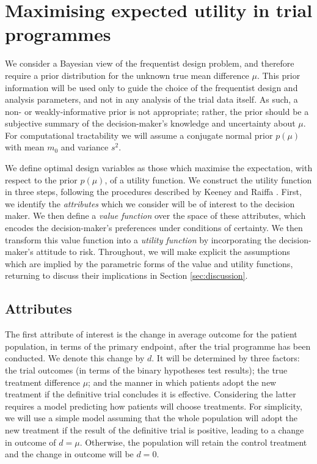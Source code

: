 \documentclass[sagev, Crown]{sagej} %
\begin{document}

\section{Maximising expected utility in trial programmes}\label{sec:methods}

We consider a Bayesian view of the frequentist design problem, and therefore require a prior distribution for the unknown true mean difference $\mu$. This prior information will be used only to guide the choice of the frequentist design and analysis parameters, and not in any analysis of the trial data itself. As such, a non- or weakly-informative prior is not appropriate; rather, the prior should be a subjective summary of the decision-maker's knowledge and uncertainty about $\mu$. For computational tractability we will assume a conjugate normal prior $p(\mu)$ with mean $m_0$ and variance $s^2$.

We define optimal design variables as those which maximise the expectation, with respect to the prior $p(\mu)$, of a utility function. We construct the utility function in three steps, following the procedures described by Keeney and Raiffa \cite{Keeney1976}. First, we identify the \emph{attributes} which we consider will be of interest to the decision maker. We then define a \emph{value function} over the space of these attributes, which encodes the decision-maker's preferences under conditions of certainty. We then transform this value function into a \emph{utility function} by incorporating the decision-maker's attitude to risk. Throughout, we will make explicit the assumptions which are implied by the parametric forms of the value and utility functions, returning to discuss their implications in Section \ref{sec:discussion}.

\subsection{Attributes}

The first attribute of interest is the change in average outcome for the patient population, in terms of the primary endpoint, after the trial programme has been conducted. We denote this change by $d$. It will be determined by three factors: the trial outcomes (in terms of the binary hypotheses test results); the true treatment difference $\mu$; and the manner in which patients adopt the new treatment if the definitive trial concludes it is effective. Considering the latter requires a model predicting how patients will choose treatments. For simplicity, we will use a simple model assuming that the whole population will adopt the new treatment if the result of the definitive trial is positive, leading to a change in outcome of $d = \mu$. Otherwise, the population will retain the control treatment and the change in outcome will be $d=0$.
\end{document}
